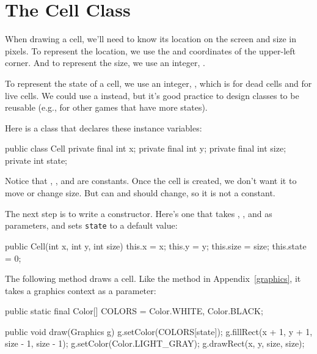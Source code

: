 \section{The Cell Class}

When drawing a cell, we'll need to know its location on the screen and size in pixels.
To represent the location, we use the  and  coordinates of the upper-left corner.
And to represent the size, we use an integer, .


To represent the state of a cell, we use an integer, , which is  for dead cells and  for live cells.
We could use a  instead, but it's good practice to design classes to be reusable (e.g., for other games that have more states).

Here is a  class that declares these instance variables:

\begin{code}
public class Cell {
    private final int x;
    private final int y;
    private final int size;
    private int state;
}
\end{code}

Notice that , , and  are constants.
Once the cell is created, we don't want it to move or change size.
But  can and should change, so it is not a constant.

The next step is to write a constructor.
Here's one that takes , , and  as parameters, and sets {\tt state} to a default value:

\begin{code}
public Cell(int x, int y, int size) {
    this.x = x;
    this.y = y;
    this.size = size;
    this.state = 0;
}
\end{code}

%

The following method draws a cell.
Like the  method in Appendix~\ref{graphics}, it takes a graphics context as a parameter:

\begin{code}
public static final Color[] COLORS = {Color.WHITE, Color.BLACK};

public void draw(Graphics g) {
    g.setColor(COLORS[state]);
    g.fillRect(x + 1, y + 1, size - 1, size - 1);
    g.setColor(Color.LIGHT_GRAY);
    g.drawRect(x, y, size, size);
}
\end{code}

